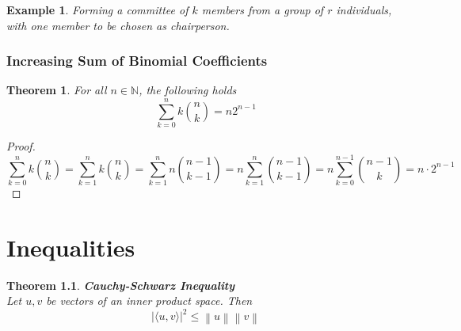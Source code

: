 \documentclass[11pt]{book} %
\newtheorem{theorem}{Theorem}[section]
\newtheorem*{example*}{Example}
\begin{document}
\begin{example*}
    Forming a committee of $k$ members from a group of $r$ individuals, with one member to be chosen as chairperson.
\end{example*}

\subsection{Increasing Sum of Binomial Coefficients}

\begin{boxA}
    \begin{theorem}
        For all $n\in \mathbb{N}$, the following holds
        \begin{equation}
            \sum_{k=0}^{n} k \binom{n}{k} = n 2^{n-1}
        \end{equation}
    \end{theorem}
\end{boxA}

\begin{proof}
    \begin{equation}
        \sum_{k=0}^{n} k \binom{n}{k} = \sum_{k=1}^{n} k \binom{n}{k} = \sum_{k=1}^{n} n \binom{n-1}{k-1} = n \sum_{k=1}^{n} \binom{n-1}{k-1} = n \sum_{k=0}^{n-1} \binom{n-1}{k} = n \cdot 2^{n-1}
    \end{equation}
\end{proof}

\chapter{Inequalities}

\begin{theorem}{\textbf{Cauchy-Schwarz Inequality}} \\
    Let $u, v$ be vectors of an inner product space. Then
    \begin{equation*}
        \left| \langle u, v \rangle \right|^2 \leq \left\| u \right\| \left\| v \right\|
    \end{equation*}
\end{theorem} 
\end{document}
